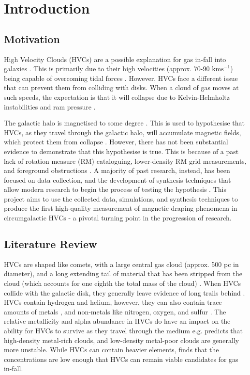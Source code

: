 \chapter{Introduction}
\label{cha:introduction}

\section{Motivation}
\label{sec:motivation}
High Velocity Clouds (HVCs) are a possible explanation for gas in-fall into galaxies \cite{ID7}. This is primarily due to their high velocities (approx. 70-90 $\mathrm{kms}^{-1}$) being capable of overcoming tidal forces \cite{ID7, ID8}. However, HVCs face a different issue that can prevent them from colliding with disks. When a cloud of gas moves at such speeds, the expectation is that it will collapse due to Kelvin-Helmholtz instabilities and ram pressure \cite{ID23, ID33, ID11}.

The galactic halo is magnetised to some degree \cite{ID30}. This is used to hypothesise that HVCs, as they travel through the galactic halo, will accumulate magnetic fields, which protect them from collapse \cite{ID10, ID11, ID13, ID23, ID24, ID34}. However, there has not been substantial evidence to demonstrate that this hypothesise is true. This is because of a past lack of rotation measure (RM) cataloguing, lower-density RM grid measurements, and foreground obstructions \cite{ID2, ID18, ID36}. A majority of past research, instead, has been focused on data collection, and the development of synthesis techniques that allow modern research to begin the process of testing the hypothesis \cite{ID18, ID1, ID3, ID6, ID5, ID30, ID26}. This project aims to use the collected data, simulations, and synthesis techniques to produce the first high-quality measurement of magnetic draping phenomena in circumgalactic HVCs - a pivotal turning point in the progression of research.

\section{Literature Review}
\label{sec:lit-review}

HVCs are shaped like comets, with a large central gas cloud (approx. 500 pc in diameter), and a long extending tail of material that has been stripped from the cloud (which accounts for one eighth the total mass of the cloud) \cite{ID34, ID13}. When HVCs collide with the galactic disk, they generally leave evidence of long trails behind \cite{ID19}. HVCs contain hydrogen and helium, however, they can also contain trace amounts of metals \cite{ID46}, and non-metals like nitrogen, oxygen, and sulfur \cite{ID48, ID49}. The relative metallicity and alpha abundance in HVCs do have an impact on the ability for HVCs to survive as they travel through the medium e.g. \citep{ID24} predicts that high-density metal-rich clouds, and low-density metal-poor clouds are generally more unstable. While HVCs can contain heavier elements, \citep{ID46} finds that the concentrations are low enough that HVCs can remain viable candidates for gas in-fall.

